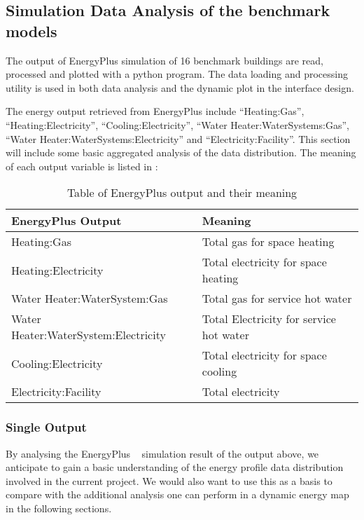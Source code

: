 \subsection{Simulation Data Analysis of the benchmark
  models}\label{boxPlot}
The output of EnergyPlus simulation of 16 benchmark buildings are
read, processed and plotted with a python program. The data loading
and processing utility is used in both data analysis and the dynamic
plot in the interface design.

The energy output retrieved from EnergyPlus include ``Heating:Gas'',
``Heating:Electricity'', ``Cooling:Electricity'', ``Water
Heater:WaterSystems:Gas'', ``Water Heater:WaterSystems:Electricity''
and ``Electricity:Facility''. This section will include some basic
aggregated analysis of the data distribution.  The meaning of each
output variable is listed in :
\begin{table}[h!]
\centering
\caption{Table of EnergyPlus output and their meaning}
\label{tab:outputMeaning}
\begin{tabular}{l|l}
  \hline
  EnergyPlus Output            & Meaning\\
  \hline
  \hline
  Heating:Gas                  & Total gas for space heating         \\
  Heating:Electricity          & Total electricity for space heating \\
  Water Heater:WaterSystem:Gas & Total gas for service hot water     \\
  Water Heater:WaterSystem:Electricity & Total Electricity for service hot water     \\
  Cooling:Electricity          & Total electricity for space cooling \\
  Electricity:Facility         & Total electricity                  \\
  \hline
\end{tabular}
\end{table}

\subsubsection{Single Output}
By analysing the EnergyPlus ~\cite{EnergyPlus2015} simulation result
of the output above, we anticipate to gain a basic understanding of
the energy profile data distribution involved in the current
project. We would also want to use this as a basis to compare with the
additional analysis one can perform in a dynamic energy map in the
following sections.

